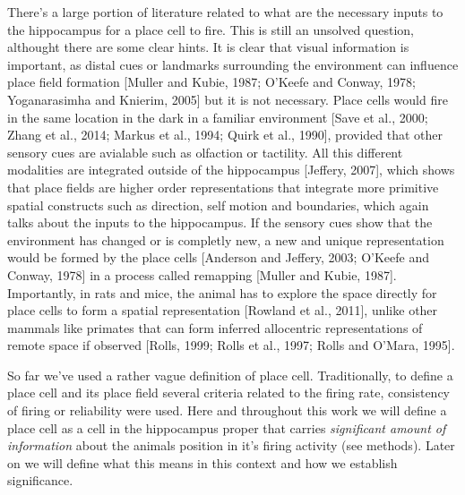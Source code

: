 There's a large portion of literature related to what are the necessary inputs to the hippocampus for a place cell to fire. 
This is still an unsolved question, althought there are some clear hints. 
It is clear that visual information is important, as distal cues or landmarks surrounding the environment can influence place field formation [Muller and Kubie, 1987; O’Keefe and Conway, 1978; Yoganarasimha and Knierim, 2005] but it is not necessary. 
Place cells would fire in the same location in the dark in a familiar environment [Save et al., 2000; Zhang et al., 2014; Markus et al., 1994; Quirk et al., 1990], provided that other sensory cues are avialable such as olfaction or tactility. 
All this different modalities are integrated outside of the hippocampus [Jeffery, 2007], which shows that place fields are higher order representations that integrate more primitive spatial constructs such as direction, self motion and boundaries, which again talks about the inputs to the hippocampus. 
If the sensory cues show that the environment has changed or is completly new, a new and unique representation would be formed by the place cells [Anderson and Jeffery, 2003; O’Keefe and Conway, 1978] in a process called remapping [Muller and Kubie, 1987]. 
Importantly, in rats and mice, the animal has to explore the space directly for place cells to form a spatial representation [Rowland et al., 2011], unlike other mammals like primates that can form inferred allocentric representations of remote space if observed [Rolls, 1999; Rolls et al., 1997; Rolls and O’Mara, 1995]. 

So far we've used a rather vague definition of place cell. 
Traditionally, to define a place cell and its place field several criteria related to the firing rate, consistency of firing or reliability were used. 
Here and throughout this work we will define a place cell as a cell in the hippocampus proper that carries \textit{significant amount of information} about the animals position in it's firing activity (see methods). Later on we will define what this means in this context and how we establish significance.  

